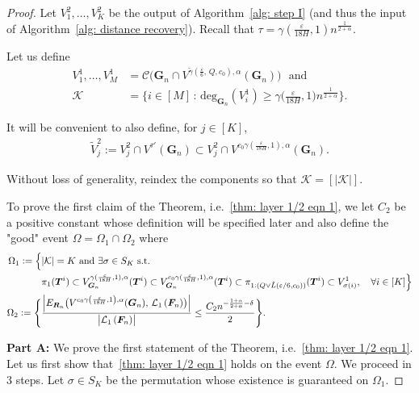 \documentclass[twoside,11pt]{article}
\theoremstyle{remark}
\begin{document}
\begin{proof}
Let $V^2_1, \ldots, V^2_K$ be the output of Algorithm~\ref{alg: step I} (and thus the input of Algorithm~\ref{alg: distance recovery}). Recall that $\tau = \gamma(\frac{\varepsilon}{18H}, 1) n^{\frac{1}{2+\alpha}}$. 

Let us define
\begin{align*}
V_1^1, \ldots, V_M^1 &= \mathcal{C}\bigl( \bm{G}_n \cap V^{\tilde{\gamma}(\frac{\varepsilon}{6},\, Q, c_0), \alpha}(\bm{G}_n)\bigr) \,\, \text{ and} \\
\mathcal{K} &= \biggl\{ i \in [M] \,: \, \text{deg}_{\bm{G}_n}(V_i^1) \geq \gamma\bigl(\frac{\varepsilon}{18H}, 1\bigr) n^{\frac{1}{2+\alpha}} \biggr\}.
\end{align*}

It will be convenient to also define, for $j \in [K]$,
\begin{align*}
\tilde{V}^2_j := V^2_j \cap V^{\tau'}(\bm{G}_n) \subset V_j^2 \cap V^{c_0 \gamma(\frac{\varepsilon}{18H}, 1), \alpha}(\bm{G}_n).
\end{align*}


Without loss of generality, reindex the components so that $\mathcal K=[|\mathcal K|]$.

To prove the first claim of the Theorem, i.e.~\eqref{thm: layer 1/2 eqn 1}, we let $C_2$ be a positive constant whose definition will be specified later and also define the "good" event $\Omega=\Omega_1\cap \Omega_2$ where
%
\begingroup
\begin{align}
\Omega_1:=\Bigl\{& {|\mathcal{K}|} = K \text{ and } \exists \sigma \in S_K \text{ s.t. } \label{eq:omega1_defn}\\
&\pi_1(\bm{T}^{i}) \subset V^{{\gamma(\frac{\varepsilon}{18H}, 1)}, \alpha}_{\bm{G}_n}(\bm{T}^i) \subset V^{{c_0\gamma(\frac{\varepsilon}{18H}, 1)}, \alpha}_{\bm{G}_n}(\bm{T}^i) \subset \pi_{1:(Q \vee {\tilde{L}(\varepsilon/6, c_0)})}(\boldsymbol{T}^{i})\subset {V}^1_{\sigma(i)},\quad \forall i \in [K]\Bigr\} \nonumber \\ 
\Omega_2:= \Biggl\{&\frac{\Bigr|E_{\boldsymbol{R}_n}\bigl(V^{c_0\gamma\left(\frac{\varepsilon}{18 H}, 1\right), \alpha}(\boldsymbol{G}_n), \,\mathcal{L}_1\left(\boldsymbol{F}_n\right)\bigr)\Bigr|}{\left| \mathcal{L}_1\left(\boldsymbol{F}_n\right)\right|}\le \frac{C_2 n^{-\frac{1+\alpha}{2+\alpha}-\delta}}{2}\Biggr\}. \nonumber
\end{align}
\endgroup
%

\textbf{Part A:} We prove the first statement of the Theorem, i.e.~\eqref{thm: layer 1/2 eqn 1}. Let us first show that~\eqref{thm: layer 1/2 eqn 1} holds on the event $\Omega$. We proceed in 3 steps. Let $\sigma \in S_K$ be the permutation whose existence is guaranteed on $\Omega_1$. 



\end{proof}
\end{document}
